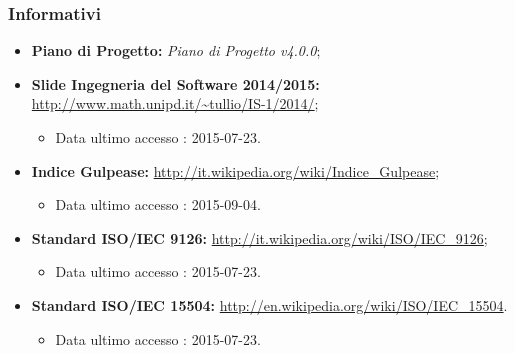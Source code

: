 	\subsubsection{Informativi}
	\begin{itemize}
		\item \textbf{Piano di Progetto:} \textit{Piano di Progetto v4.0.0};
		\item \textbf{\gls{Slide} Ingegneria del Software 2014/2015:} \url{http://www.math.unipd.it/~tullio/IS-1/2014/};
		\begin{itemize}
			\item Data ultimo accesso : 2015-07-23.						
		\end{itemize}
		\item \textbf{Indice {Gulpease}:} \url{http://it.wikipedia.org/wiki/Indice_Gulpease};
		\begin{itemize}
			\item Data ultimo accesso : 2015-09-04.						
		\end{itemize}
		\item \textbf{Standard ISO/IEC 9126:} \url{http://it.wikipedia.org/wiki/ISO/IEC_9126};
		\begin{itemize}
			\item Data ultimo accesso : 2015-07-23.						
		\end{itemize}
		\item \textbf{Standard ISO/IEC 15504:} \url{http://en.wikipedia.org/wiki/ISO/IEC_15504}.
		\begin{itemize}
			\item Data ultimo accesso : 2015-07-23.						
		\end{itemize}
	\end{itemize}

